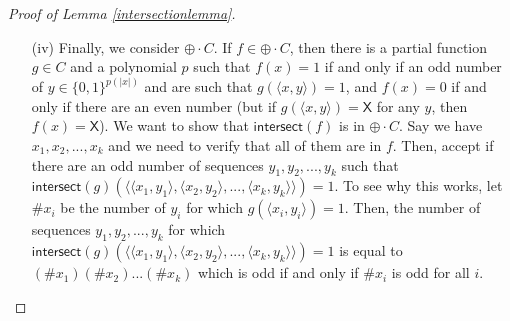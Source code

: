 \documentclass[11pt]{article}
\newcommand{\parity}{\oplus}
\newcommand{\x}{\textsf{X}}
\newcommand{\intersect}{\textsf{intersect}}
\begin{document}
\begin{proof}[Proof of Lemma \ref{intersectionlemma}]
\begin{enumerate}
\item[(iv)] Finally, we consider $\parity \cdot C$. If $f \in \parity \cdot C$, then there is a partial function $g \in C$ and a polynomial $p$ such that $f(x) = 1$ if and only if an odd number of $y \in \{0,1\}^{p(|x|)}$ and are such that $g(\langle x, y\rangle) = 1$, and $f(x) = 0$ if and only if there are an even number (but if $g(\langle x,y\rangle) = \x$ for any $y$, then $f(x) = \x$). We want to show that $\intersect(f)$ is in $\parity \cdot C$. Say we have $x_1,x_2,...,x_k$ and we need to verify that all of them are in $f$. Then, accept if there are an odd number of sequences $y_1,y_2,...,y_k$ such that $\intersect(g)(\langle\langle x_1,y_1\rangle,\langle x_2,y_2\rangle,...,\langle x_k,y_k\rangle\rangle) = 1$. To see why this works, let $\# x_i$ be the number of $y_i$ for which $g(\langle x_i,y_i\rangle) = 1$. Then, the number of sequences $y_1,y_2,...,y_k$ for which $\intersect(g)(\langle\langle x_1,y_1\rangle,\langle x_2,y_2\rangle,...,\langle x_k,y_k\rangle\rangle) = 1$ is equal to $(\# x_1)(\# x_2)...(\# x_k)$ which is odd if and only if $\# x_i$ is odd for all $i$.
\end{enumerate}
\end{proof}
\end{document}
